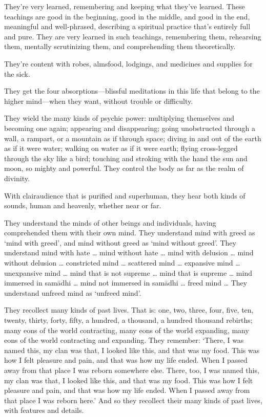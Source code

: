\documentclass[12pt,openany]{book}%
\begin{document}
They’re very learned, remembering and keeping what they’ve learned. These teachings are good in the beginning, good in the middle, and good in the end, meaningful and well-phrased, describing a spiritual practice that’s entirely full and pure. They are very learned in such teachings, remembering them, rehearsing them, mentally scrutinizing them, and comprehending them theoretically. 

They’re content with robes, almsfood, lodgings, and medicines and supplies for the sick. 

They get the four absorptions—blissful meditations in this life that belong to the higher mind—when they want, without trouble or difficulty. 

They wield the many kinds of psychic power: multiplying themselves and becoming one again; appearing and disappearing; going unobstructed through a wall, a rampart, or a mountain as if through space; diving in and out of the earth as if it were water; walking on water as if it were earth; flying cross-legged through the sky like a bird; touching and stroking with the hand the sun and moon, so mighty and powerful. They control the body as far as the realm of divinity. 

With clairaudience that is purified and superhuman, they hear both kinds of sounds, human and heavenly, whether near or far. 

They understand the minds of other beings and individuals, having comprehended them with their own mind. They understand mind with greed as ‘mind with greed’, and mind without greed as ‘mind without greed’. They understand mind with hate … mind without hate … mind with delusion … mind without delusion … constricted mind … scattered mind … expansive mind … unexpansive mind … mind that is not supreme … mind that is supreme … mind immersed in \textsanskrit{samādhi} … mind not immersed in \textsanskrit{samādhi} … freed mind … They understand unfreed mind as ‘unfreed mind’. 

They recollect many kinds of past lives. That is: one, two, three, four, five, ten, twenty, thirty, forty, fifty, a hundred, a thousand, a hundred thousand rebirths; many eons of the world contracting, many eons of the world expanding, many eons of the world contracting and expanding. They remember: ‘There, I was named this, my clan was that, I looked like this, and that was my food. This was how I felt pleasure and pain, and that was how my life ended. When I passed away from that place I was reborn somewhere else. There, too, I was named this, my clan was that, I looked like this, and that was my food. This was how I felt pleasure and pain, and that was how my life ended. When I passed away from that place I was reborn here.’ And so they recollect their many kinds of past lives, with features and details. 
\end{document}
